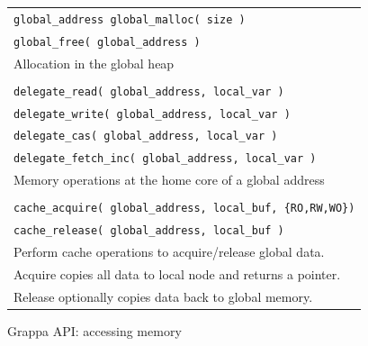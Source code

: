 \begin{figure}[htbp]
  \begin{center}
    \begin{minipage}{\columnwidth}
	\small
	\begin{tabular}{l}
      	\texttt{\scriptsize global\_address global\_malloc( size )} \\
      	\texttt{\scriptsize global\_free( global\_address )} \\ \hline 
      	Allocation in the global heap \\ \\
      	\texttt{\scriptsize delegate\_read( global\_address, local\_var )}  \\
      	\texttt{\scriptsize delegate\_write( global\_address, local\_var )} \\
      	\texttt{\scriptsize delegate\_cas( global\_address, local\_var )} \\
      	\texttt{\scriptsize delegate\_fetch\_inc( global\_address, local\_var )} \\ \hline
      	Memory operations at the home core of a global address \\ \\
      	\texttt{\scriptsize cache\_acquire( global\_address, local\_buf, \{RO,RW,WO\})} \\
      	\texttt{\scriptsize cache\_release( global\_address, local\_buf )} \\ \hline
		Perform cache operations to acquire/release global data.  \\
		Acquire copies all data to local node and returns a pointer. \\ 	
		Release optionally copies data back to global memory. \\
	\end{tabular}
      \caption{\label{fig:accessing-memory} Grappa API: accessing memory}     \end{minipage}
  \end{center}
\end{figure}

